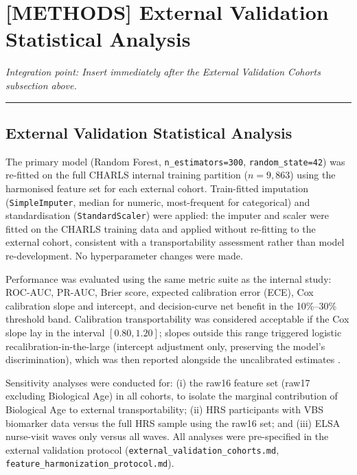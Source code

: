 \documentclass[11pt,a4paper]{article}
\begin{document}
\section*{[METHODS] External Validation Statistical Analysis}
\noindent\textit{Integration point: Insert immediately after the External Validation Cohorts subsection above.}

\vspace{4pt}
\hrule
\vspace{8pt}

\subsection*{External Validation Statistical Analysis}

The primary model (Random Forest, \texttt{n\_estimators=300}, \texttt{random\_state=42}) was re-fitted on the full CHARLS internal training partition ($n=9{,}863$) using the harmonised feature set for each external cohort. Train-fitted imputation (\texttt{SimpleImputer}, median for numeric, most-frequent for categorical) and standardisation (\texttt{StandardScaler}) were applied: the imputer and scaler were fitted on the CHARLS training data and applied without re-fitting to the external cohort, consistent with a transportability assessment rather than model re-development. No hyperparameter changes were made.

Performance was evaluated using the same metric suite as the internal study: ROC-AUC, PR-AUC, Brier score, expected calibration error (ECE), Cox calibration slope and intercept, and decision-curve net benefit in the 10\%--30\% threshold band. Calibration transportability was considered acceptable if the Cox slope lay in the interval $[0.80, 1.20]$; slopes outside this range triggered logistic recalibration-in-the-large (intercept adjustment only, preserving the model's discrimination), which was then reported alongside the uncalibrated estimates \cite{Steyerberg2019,VanCalster2019}.

Sensitivity analyses were conducted for: (i) the raw16 feature set (raw17 excluding Biological Age) in all cohorts, to isolate the marginal contribution of Biological Age to external transportability; (ii) HRS participants with VBS biomarker data versus the full HRS sample using the raw16 set; and (iii) ELSA nurse-visit waves only versus all waves. All analyses were pre-specified in the external validation protocol (\texttt{external\_validation\_cohorts.md}, \texttt{feature\_harmonization\_protocol.md}).
\end{document}
